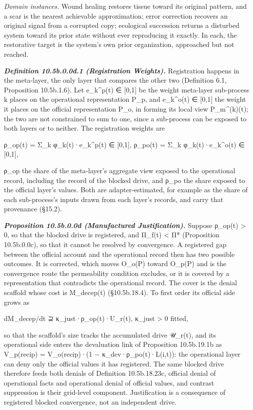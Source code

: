 \documentclass[
]{article}
\begin{document}
\emph{Domain instances.} Wound healing restores tissue toward its
original pattern, and a scar is the nearest achievable approximation;
error correction recovers an original signal from a corrupted copy;
ecological succession returns a disturbed system toward its prior state
without ever reproducing it exactly. In each, the restorative target is
the system's own prior organization, approached but not reached.

\emph{\textbf{Definition 10.5b.0.0d.1 (Registration Weights).}}
Registration happens in the meta-layer, the only layer that compares the
other two (Definition 6.1, Proposition 10.5b.1.6). Let e\_k\^{}p(t) ∈
{[}0,1{]} be the weight meta-layer sub-process k places on the
operational representation P\_p, and e\_k\^{}o(t) ∈ {[}0,1{]} the weight
it places on the official representation P\_o, in forming its local view
P\_m\^{}(k)(t); the two are not constrained to sum to one, since a
sub-process can be exposed to both layers or to neither. The
registration weights are

ρ\_op(t) = Σ\_k φ\_k(t)·e\_k\^{}p(t) ∈ {[}0,1{]}, ρ\_po(t) = Σ\_k
φ\_k(t)·e\_k\^{}o(t) ∈ {[}0,1{]},

ρ\_op the share of the meta-layer's aggregate view exposed to the
operational record, including the record of the blocked drive, and ρ\_po
the share exposed to the official layer's values. Both are
adapter-estimated, for example as the share of each sub-process's inputs
drawn from each layer's records, and carry that provenance (§15.2).

\emph{\textbf{Proposition 10.5b.0.0d (Manufactured Justification).}}
Suppose ρ\_op(t) \textgreater{} 0, so that the blocked drive is
registered, and Π\_f(t) \textless{} Π* (Proposition 10.5b.0.0c), so that
it cannot be resolved by convergence. A registered gap between the
official account and the operational record then has two possible
outcomes. It is corrected, which moves O\_o(P) toward O\_p(P) and is the
convergence route the permeability condition excludes, or it is covered
by a representation that contradicts the operational record. The cover
is the denial scaffold whose cost is M\_decep(t) (§10.5b.18.4). To first
order its official side grows as

dM\_decep/dt ⊇ κ\_just·ρ\_op(t)·U\_r(t), κ\_just \textgreater{} 0
fitted,

so that the scaffold's size tracks the accumulated drive 𝒰\_r(t), and
its operational side enters the devaluation link of Proposition
10.5b.19.1b as V\_p(recip) = V\_o(recip)·(1 − κ\_dev·ρ\_po(t)·L(i,t)):
the operational layer can deny only the official values it has
registered. The same blocked drive therefore feeds both denials of
Definition 10.5b.18.23c, official denial of operational facts and
operational denial of official values, and contrast suppression is their
grid-level component. Justification is a consequence of registered
blocked convergence, not an independent drive.
\end{document}
